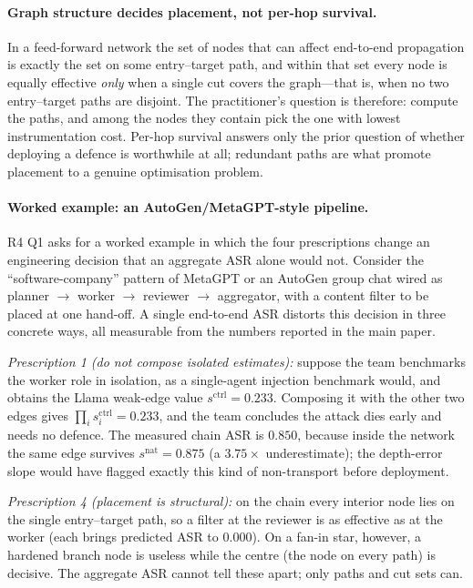 \documentclass[sigconf,anonymous]{aamas}
\newcommand{\scite}[1]{\ensuremath{s^{\mathrm{ctrl}}_{#1}}}
\newcommand{\scites}{\ensuremath{s^{\mathrm{ctrl}}}}
\newcommand{\snats}{\ensuremath{s^{\mathrm{nat}}}}
\begin{document}
\paragraph{Graph structure decides placement, not per-hop survival.} In a feed-forward
network the set of nodes that can affect end-to-end propagation is exactly the set on
some entry--target path, and within that set every node is equally effective
\emph{only} when a single cut covers the graph---that is, when no two entry--target
paths are disjoint. The practitioner's question is therefore: compute the paths, and
among the nodes they contain pick the one with lowest instrumentation cost. Per-hop
survival answers only the prior question of whether deploying a defence is worthwhile
at all; redundant paths are what promote placement to a genuine optimisation problem.

\paragraph{Worked example: an AutoGen/MetaGPT-style pipeline.} R4 Q1 asks for a worked
example in which the four prescriptions change an engineering decision that an aggregate
ASR alone would not. Consider the ``software-company'' pattern of MetaGPT or an AutoGen
group chat wired as planner $\to$ worker $\to$ reviewer $\to$ aggregator, with a content
filter to be placed at one hand-off. A single end-to-end ASR distorts this decision in
three concrete ways, all measurable from the numbers reported in the main paper.

\emph{Prescription 1 (do not compose isolated estimates):} suppose the team benchmarks
the worker role in isolation, as a single-agent injection benchmark would, and obtains
the Llama weak-edge value $\scites = 0.233$. Composing it with the other two edges gives
$\prod_i \scite{i} = 0.233$, and the team concludes the attack dies early and needs no
defence. The measured chain ASR is $0.850$, because inside the network the same edge
survives $\snats = 0.875$ (a $3.75\times$ underestimate); the depth-error slope would
have flagged exactly this kind of non-transport before deployment.

\emph{Prescription 4 (placement is structural):} on the chain every interior node lies
on the single entry--target path, so a filter at the reviewer is as effective as at the
worker (each brings predicted ASR to $0.000$). On a fan-in star, however, a hardened
branch node is useless while the centre (the node on every path) is decisive. The
aggregate ASR cannot tell these apart; only paths and cut sets can.
\end{document}
